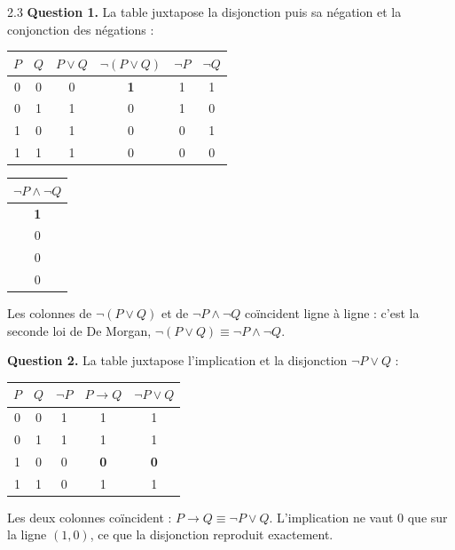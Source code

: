 \begin{corrige}{2.3}
\textbf{Question 1.} La table juxtapose la disjonction puis sa négation et la conjonction des négations :

\begin{center}
\begin{tabular}{cc|cc|cc}
\toprule
\rowcolor{robleuf}$P$ & $Q$ & $P \lor Q$ & $\lnot (P \lor Q)$ & $\lnot P$ & $\lnot Q$ \\
\midrule
0 & 0 & 0 & \textbf{1} & 1 & 1 \\
\rowcolor{rogrisf!50}0 & 1 & 1 & 0 & 1 & 0 \\
1 & 0 & 1 & 0 & 0 & 1 \\
\rowcolor{rogrisf!50}1 & 1 & 1 & 0 & 0 & 0 \\
\bottomrule
\end{tabular}
\qquad
\begin{tabular}{c}
\toprule
\rowcolor{robleuf}$\lnot P \land \lnot Q$ \\
\midrule
\textbf{1} \\
\rowcolor{rogrisf!50}0 \\
0 \\
\rowcolor{rogrisf!50}0 \\
\bottomrule
\end{tabular}
\end{center}
Les colonnes de $\lnot (P \lor Q)$ et de $\lnot P \land \lnot Q$ coïncident ligne à ligne : c'est la seconde loi de De Morgan, $\lnot (P \lor Q) \equiv \lnot P \land \lnot Q$.

\textbf{Question 2.} La table juxtapose l'implication et la disjonction $\lnot P \lor Q$ :

\begin{center}
\begin{tabular}{cc|cc|c}
\toprule
\rowcolor{robleuf}$P$ & $Q$ & $\lnot P$ & $P \rightarrow Q$ & $\lnot P \lor Q$ \\
\midrule
0 & 0 & 1 & 1 & 1 \\
\rowcolor{rogrisf!50}0 & 1 & 1 & 1 & 1 \\
1 & 0 & 0 & \textbf{0} & \textbf{0} \\
\rowcolor{rogrisf!50}1 & 1 & 0 & 1 & 1 \\
\bottomrule
\end{tabular}
\end{center}
Les deux colonnes coïncident : $P \rightarrow Q \equiv \lnot P \lor Q$. L'implication ne vaut 0 que sur la ligne $(1, 0)$, ce que la disjonction reproduit exactement.


\end{corrige}
